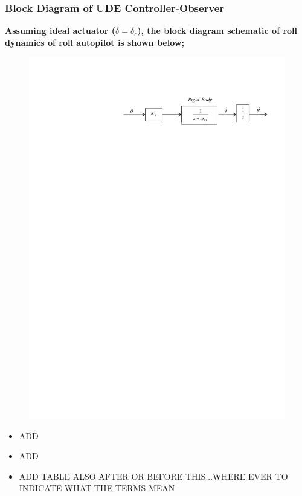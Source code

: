 \documentclass[table,10pt,red]{beamer}	%
\begin{document}
	\begin{frame}
	\frametitle{Block Diagram of UDE Controller-Observer}
	\textbf{Assuming ideal actuator ($\delta=\delta_c$), the block diagram schematic of roll dynamics of roll autopilot is shown below;}
	\begin{figure}
	\includegraphics[width=0.8\linewidth]{fig1}
	\end{figure}
	\begin{itemize}  %
		\item ADD
		\item ADD
		\item ADD TABLE ALSO AFTER OR BEFORE THIS...WHERE EVER TO INDICATE WHAT THE TERMS MEAN
	\end{itemize}
\end{frame}
\end{document}
